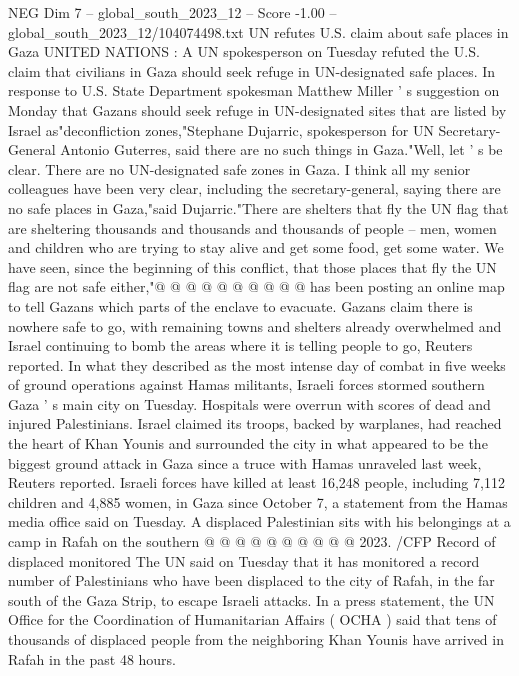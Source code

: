 \begin{textsample}{NEG Dim 7 – global\_south\_2023\_12 – Score -1.00 – global\_south\_2023\_12/104074498.txt}  \label{ex:f7_neg_196}
UN refutes U.S. claim about safe places in Gaza UNITED NATIONS : A UN spokesperson on Tuesday refuted the U.S. claim that civilians in Gaza should seek refuge in UN-designated safe places.
In response to U.S.
State Department spokesman Matthew Miller ' s suggestion on Monday that Gazans should seek refuge in UN-designated sites that are listed by Israel as"deconfliction zones,"Stephane Dujarric, spokesperson for UN Secretary-General Antonio Guterres, said there are no such things in Gaza."Well, let ' s be clear.
There are no UN-designated safe zones in Gaza.
I think all my senior colleagues have been very clear, including the secretary-general, saying there are no safe places in Gaza,"said Dujarric."There are shelters that fly the UN flag that are sheltering thousands and thousands and thousands of people -- men, women and children who are trying to stay alive and get some food, get some water.
We have seen, since the beginning of this conflict, that those places that fly the UN flag are not safe either,"@ @ @ @ @ @ @ @ @ @ has been posting an online map to tell Gazans which parts of the enclave to evacuate.
Gazans claim there is nowhere safe to go, with remaining towns and shelters already overwhelmed and Israel continuing to bomb the areas where it is telling people to go, Reuters reported.
In what they described as the most intense day of combat in five weeks of ground operations against Hamas militants, Israeli forces stormed southern Gaza ' s main city on Tuesday.
Hospitals were overrun with scores of dead and injured Palestinians.
Israel claimed its troops, backed by warplanes, had reached the heart of Khan Younis and surrounded the city in what appeared to be the biggest ground attack in Gaza since a truce with Hamas unraveled last week, Reuters reported.
Israeli forces have killed at least 16,248 people, including 7,112 children and 4,885 women, in Gaza since October 7, a statement from the Hamas media office said on Tuesday.
A displaced Palestinian sits with his belongings at a camp in Rafah on the southern @ @ @ @ @ @ @ @ @ @ 2023. /CFP Record of displaced monitored The UN said on Tuesday that it has monitored a record number of Palestinians who have been displaced to the city of Rafah, in the far south of the Gaza Strip, to escape Israeli attacks.
In a press statement, the UN Office for the Coordination of Humanitarian Affairs ( OCHA ) said that tens of thousands of displaced people from the neighboring Khan Younis have arrived in Rafah in the past 48 hours.

\end{textsample}
